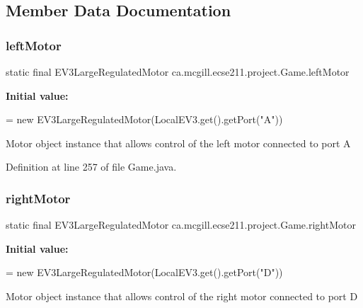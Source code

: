 \subsection{Member Data Documentation}
\mbox{\label{enumca_1_1mcgill_1_1ecse211_1_1project_1_1_game_a7c673571bf50fdb6917a9d7bb671e003}} 
\subsubsection{\texorpdfstring{left\+Motor}{leftMotor}}
{\footnotesize\ttfamily  static  final E\+V3\+Large\+Regulated\+Motor ca.\+mcgill.\+ecse211.\+project.\+Game.\+left\+Motor\hspace{0.3cm}{\ttfamily [static]}}

{\bfseries Initial value\+:}
\begin{DoxyCode}
=
      \textcolor{keyword}{new} EV3LargeRegulatedMotor(LocalEV3.get().getPort(\textcolor{stringliteral}{"A"}))
\end{DoxyCode}
Motor object instance that allows control of the left motor connected to port A 

Definition at line 257 of file Game.\+java.

\mbox{\label{enumca_1_1mcgill_1_1ecse211_1_1project_1_1_game_a7a05fcf37c4435c32270776a427ba0d2}} 
\subsubsection{\texorpdfstring{right\+Motor}{rightMotor}}
{\footnotesize\ttfamily  static  final E\+V3\+Large\+Regulated\+Motor ca.\+mcgill.\+ecse211.\+project.\+Game.\+right\+Motor\hspace{0.3cm}{\ttfamily [static]}}

{\bfseries Initial value\+:}
\begin{DoxyCode}
=
      \textcolor{keyword}{new} EV3LargeRegulatedMotor(LocalEV3.get().getPort(\textcolor{stringliteral}{"D"}))
\end{DoxyCode}
Motor object instance that allows control of the right motor connected to port D 

